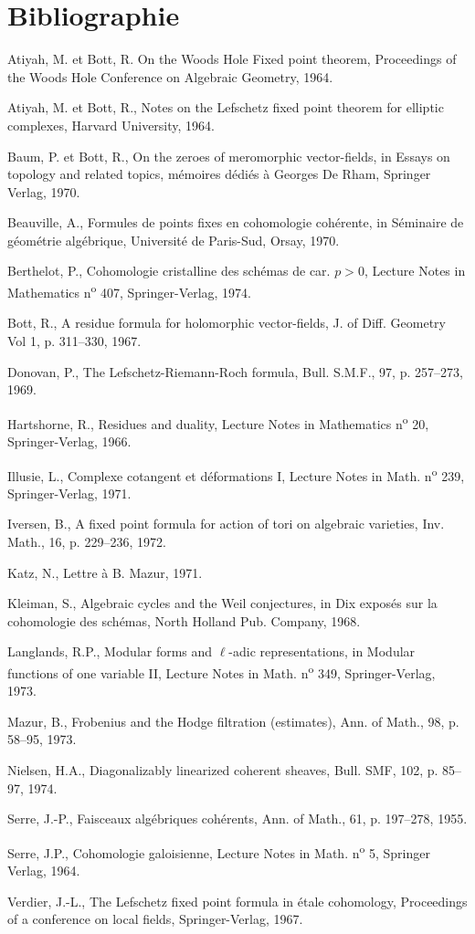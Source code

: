 \documentclass[11pt]{article}
\begin{document}
\section*{Bibliographie}
\begin{enumerate}[label={[\arabic*]},leftmargin=3.5em]
\item Atiyah, M. et Bott, R. On the Woods Hole Fixed point theorem, Proceedings of the Woods Hole Conference on Algebraic Geometry, 1964.
\item Atiyah, M. et Bott, R., Notes on the Lefschetz fixed point theorem for elliptic complexes, Harvard University, 1964.
\item Baum, P. et Bott, R., On the zeroes of meromorphic vector-fields, in Essays on topology and related topics, mémoires dédiés à Georges De Rham, Springer Verlag, 1970.
\item Beauville, A., Formules de points fixes en cohomologie cohérente, in Séminaire de géométrie algébrique, Université de Paris-Sud, Orsay, 1970.
\item Berthelot, P., Cohomologie cristalline des schémas de car. $p>0$, Lecture Notes in Mathematics n\textsuperscript{o} 407, Springer-Verlag, 1974.
\item Bott, R., A residue formula for holomorphic vector-fields, J. of Diff. Geometry Vol 1, p. 311--330, 1967.
\item Donovan, P., The Lefschetz-Riemann-Roch formula, Bull. S.M.F., 97, p. 257--273, 1969.
\item Hartshorne, R., Residues and duality, Lecture Notes in Mathematics n\textsuperscript{o} 20, Springer-Verlag, 1966.
\item Illusie, L., Complexe cotangent et déformations I, Lecture Notes in Math. n\textsuperscript{o} 239, Springer-Verlag, 1971.
\item Iversen, B., A fixed point formula for action of tori on algebraic varieties, Inv. Math., 16, p. 229--236, 1972.
\item Katz, N., Lettre à B. Mazur, 1971.
\item Kleiman, S., Algebraic cycles and the Weil conjectures, in Dix exposés sur la cohomologie des schémas, North Holland Pub. Company, 1968.
\item Langlands, R.P., Modular forms and $\ell$-adic representations, in Modular functions of one variable II, Lecture Notes in Math. n\textsuperscript{o} 349, Springer-Verlag, 1973.
\item Mazur, B., Frobenius and the Hodge filtration (estimates), Ann. of Math., 98, p. 58--95, 1973.
\item Nielsen, H.A., Diagonalizably linearized coherent sheaves, Bull. SMF, 102, p. 85--97, 1974.
\item Serre, J.-P., Faisceaux algébriques cohérents, Ann. of Math., 61, p. 197--278, 1955.
\item Serre, J.P., Cohomologie galoisienne, Lecture Notes in Math. n\textsuperscript{o} 5, Springer Verlag, 1964.
\item Verdier, J.-L., The Lefschetz fixed point formula in étale cohomology, Proceedings of a conference on local fields, Springer-Verlag, 1967.
\end{enumerate}
\end{document}
